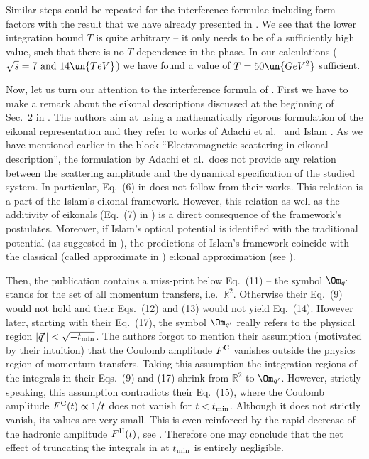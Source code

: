 Similar steps could be repeated for the interference formulae including form factors with the result that we have already presented in . We see that the lower integration bound $T$ is quite arbitrary -- it only needs to be of a sufficiently high value, such that there is no $T$ dependence in the phase. In our calculations ($\sqrt s = 7 \hbox{ and } 14\un{TeV}$) we have found a value of $T=50\un{GeV^2}$ sufficient.


Now, let us turn our attention to the interference formula of \KaL{}. First we have to make a remark about the eikonal descriptions discussed at the beginning of Sec.~2 in . The authors aim at using a mathematically rigorous formulation of the eikonal representation and they refer to works of Adachi et al.~ and Islam . As we have mentioned earlier in the block ``Electromagnetic scattering in eikonal description'', the formulation by Adachi et al.~does not provide any relation between the scattering amplitude and the dynamical specification of the studied system. In particular, Eq.~(6) in  does not follow from their works. This relation is a part of the Islam's eikonal framework. However, this relation as well as the additivity of eikonals (Eq.~(7) in ) is a direct consequence of the framework's postulates. Moreover, if Islam's optical potential is identified with the traditional potential (as suggested in ), the predictions of Islam's framework coincide with the classical (called approximate in ) eikonal approximation (see ).

Then, the publication  contains a miss-print below Eq.~(11) -- the symbol $\Om_{q'}$ stands for the set of all momentum transfers, i.e.~$\mathbb{R}^2$. Otherwise their Eq.~(9) would not hold and their Eqs.~(12) and (13) would not yield Eq.~(14). However later, starting with their Eq.~(17), the symbol $\Om_{q'}$ really refers to the physical region $|\vec q'| < \sqrt{-t_{\rm min}}$. The authors forgot to mention their assumption (motivated by their intuition) that the Coulomb amplitude $F^{\rm C}$ vanishes outside the physics region of momentum transfers. Taking this assumption the integration regions of the integrals in their Eqs.~(9) and (17) shrink from $\mathbb R^2$ to $\Om_{q'}$. However, strictly speaking, this assumption contradicts their Eq.~(15), where the Coulomb amplitude $F^{\rm C}(t) \propto 1/t$ does not vanish for $t < t_{\rm min}$. Although it does not strictly vanish, its values are very small. This is even reinforced by the rapid decrease of the hadronic amplitude $F^{\rm H}(t)$, see . Therefore one may conclude that the net effect of truncating the integrals in  at $t_{\rm min}$ is entirely negligible.

